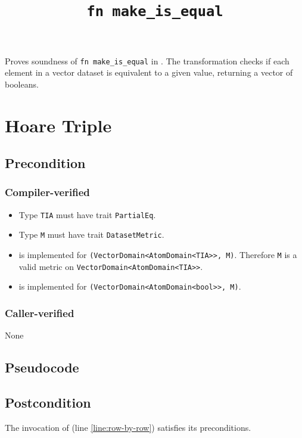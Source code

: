 \documentclass{article}
\title{\texttt{fn make\_is\_equal}}
\author{\SilviaCasacubertaAuthor}
\date{}
\begin{document}
\maketitle

\contrib
Proves soundness of \texttt{fn make\_is\_equal} in .
The transformation checks if each element in a vector dataset is equivalent to a given value,
returning a vector of booleans.

\section{Hoare Triple}
\subsection*{Precondition}
\subsubsection*{Compiler-verified}
\begin{itemize}
    \item Type \texttt{TIA} must have trait \texttt{PartialEq}.
    \item Type \texttt{M} must have trait \texttt{DatasetMetric}.
    \item {} is implemented for \texttt{(VectorDomain<AtomDomain<TIA>{}>, M)}. Therefore \texttt{M} is a valid metric on \texttt{VectorDomain<AtomDomain<TIA>{}>}.
    \item {} is implemented for \texttt{(VectorDomain<AtomDomain<bool>{}>, M)}.
\end{itemize}

\subsubsection*{Caller-verified}
None

\subsection*{Pseudocode}


\subsection*{Postcondition}
\begin{theorem}
\end{theorem}
\begin{lemma}
    The invocation of  (line \ref{line:row-by-row}) satisfies its preconditions.
\end{lemma}
\end{document}
